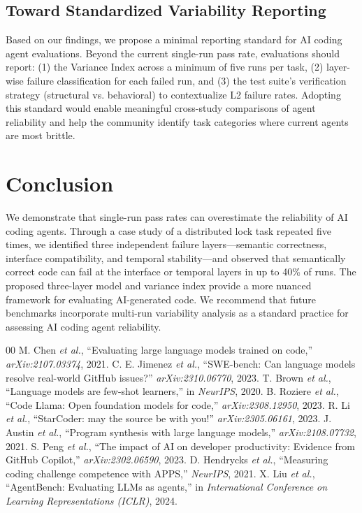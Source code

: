 \documentclass[conference]{IEEEtran}
\begin{document}
\subsection{Toward Standardized Variability Reporting}

Based on our findings, we propose a minimal reporting standard for AI coding agent evaluations. Beyond the current single-run pass rate, evaluations should report: (1) the Variance Index across a minimum of five runs per task, (2) layer-wise failure classification for each failed run, and (3) the test suite's verification strategy (structural vs. behavioral) to contextualize L2 failure rates. Adopting this standard would enable meaningful cross-study comparisons of agent reliability and help the community identify task categories where current agents are most brittle.

\section{Conclusion}

We demonstrate that single-run pass rates can overestimate the reliability of AI coding agents.
Through a case study of a distributed lock task repeated five times, we identified three independent failure layers---semantic correctness, interface compatibility, and temporal stability---and observed that semantically correct code can fail at the interface or temporal layers in up to 40\% of runs.
The proposed three-layer model and variance index provide a more nuanced framework for evaluating AI-generated code.
We recommend that future benchmarks incorporate multi-run variability analysis as a standard practice for assessing AI coding agent reliability.

\begin{thebibliography}{00}
M. Chen \textit{et al.}, ``Evaluating large language models trained on code,'' \textit{arXiv:2107.03374}, 2021.
C. E. Jimenez \textit{et al.}, ``SWE-bench: Can language models resolve real-world GitHub issues?'' \textit{arXiv:2310.06770}, 2023.
T. Brown \textit{et al.}, ``Language models are few-shot learners,'' in \textit{NeurIPS}, 2020.
B. Roziere \textit{et al.}, ``Code Llama: Open foundation models for code,'' \textit{arXiv:2308.12950}, 2023.
R. Li \textit{et al.}, ``StarCoder: may the source be with you!'' \textit{arXiv:2305.06161}, 2023.
J. Austin \textit{et al.}, ``Program synthesis with large language models,'' \textit{arXiv:2108.07732}, 2021.
S. Peng \textit{et al.}, ``The impact of AI on developer productivity: Evidence from GitHub Copilot,'' \textit{arXiv:2302.06590}, 2023.
D. Hendrycks \textit{et al.}, ``Measuring coding challenge competence with APPS,'' \textit{NeurIPS}, 2021.
X. Liu \textit{et al.}, ``AgentBench: Evaluating LLMs as agents,'' in \textit{International Conference on Learning Representations (ICLR)}, 2024.
\end{thebibliography}
\end{document}
